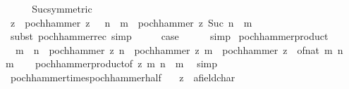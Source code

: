 \begin{isabellebody}
\ \ \isamarkupfalse%
\ \isamarkupfalse%
\ Suc{\isacharbrackleft}{\kern0pt}symmetric{\isacharbrackright}{\kern0pt}\isanewline
\ \ \isamarkupfalse%
\ \isamarkupfalse%
\ {\isachardoublequoteopen}z\ {\isacharasterisk}{\kern0pt}\ pochhammer\ {\isacharparenleft}{\kern0pt}z\ {\isacharplus}{\kern0pt}\ {}{\isacharparenright}{\kern0pt}\ {\isacharparenleft}{\kern0pt}n\ {\isacharplus}{\kern0pt}\ m{\isacharparenright}{\kern0pt}\ {\isacharequal}{\kern0pt}\ pochhammer\ z\ {\isacharparenleft}{\kern0pt}Suc\ {\isacharparenleft}{\kern0pt}n\ {\isacharplus}{\kern0pt}\ m{\isacharparenright}{\kern0pt}{\isacharparenright}{\kern0pt}{\isachardoublequoteclose}\isanewline
\ \ \ \ \isamarkupfalse%
\ {\isacharparenleft}{\kern0pt}subst\ pochhammer{\isacharunderscore}{\kern0pt}rec{\isacharparenright}{\kern0pt}\ simp\isanewline
\ \ \isamarkupfalse%
\ \isamarkupfalse%
\ {\isacharquery}{\kern0pt}case\isanewline
\ \ \ \ \isamarkupfalse%
\ simp\isanewline
{}\isamarkupfalse%
%
\endisatagproof
{\isafoldproof}%
%
\isadelimproof
\isanewline
%
\endisadelimproof
\isanewline
{}\isamarkupfalse%
\ pochhammer{\isacharunderscore}{\kern0pt}product{\isacharcolon}{\kern0pt}\isanewline
\ \ {\isachardoublequoteopen}m\ {\isasymle}\ n\ {\isasymLongrightarrow}\ pochhammer\ z\ n\ {\isacharequal}{\kern0pt}\ pochhammer\ z\ m\ {\isacharasterisk}{\kern0pt}\ pochhammer\ {\isacharparenleft}{\kern0pt}z\ {\isacharplus}{\kern0pt}\ of{\isacharunderscore}{\kern0pt}nat\ m{\isacharparenright}{\kern0pt}\ {\isacharparenleft}{\kern0pt}n\ {\isacharminus}{\kern0pt}\ m{\isacharparenright}{\kern0pt}{\isachardoublequoteclose}\isanewline
%
\isadelimproof
\ \ %
\endisadelimproof
%
\isatagproof
{}\isamarkupfalse%
\ pochhammer{\isacharunderscore}{\kern0pt}product{\isacharprime}{\kern0pt}{\isacharbrackleft}{\kern0pt}of\ z\ m\ {\isachardoublequoteopen}n\ {\isacharminus}{\kern0pt}\ m{\isachardoublequoteclose}{\isacharbrackright}{\kern0pt}\ \isamarkupfalse%
\ simp%
\endisatagproof
{\isafoldproof}%
%
\isadelimproof
\isanewline
%
\endisadelimproof
\isanewline
{}\isamarkupfalse%
\ pochhammer{\isacharunderscore}{\kern0pt}times{\isacharunderscore}{\kern0pt}pochhammer{\isacharunderscore}{\kern0pt}half{\isacharcolon}{\kern0pt}\isanewline
\ \ \ z\ {\isacharcolon}{\kern0pt}{\isacharcolon}{\kern0pt}\ {\isachardoublequoteopen}{\isacharprime}{\kern0pt}a{\isacharcolon}{\kern0pt}{\isacharcolon}{\kern0pt}field{\isacharunderscore}{\kern0pt}char{\isacharunderscore}{\kern0pt}{}{\isachardoublequoteclose}\isanewline

\end{isabellebody}

